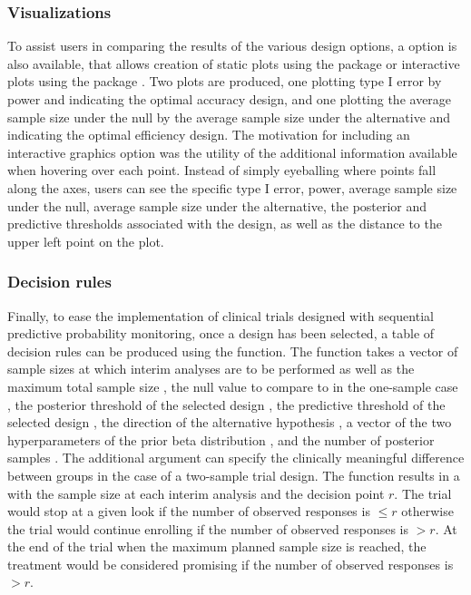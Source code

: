 \hypertarget{visualizations}{%
\subsubsection{Visualizations}\label{visualizations}}

To assist users in comparing the results of the various design options,
a  option is also available, that allows creation of static
plots using the  package \citep{Wickham2016} or
interactive plots using the  package
\citep{Sievert2020}. Two plots are produced, one plotting type I error
by power and indicating the optimal accuracy design, and one plotting
the average sample size under the null by the average sample size under
the alternative and indicating the optimal efficiency design. The
motivation for including an interactive graphics option was the utility
of the additional information available when hovering over each point.
Instead of simply eyeballing where points fall along the axes, users can
see the specific type I error, power, average sample size under the
null, average sample size under the alternative, the posterior and
predictive thresholds associated with the design, as well as the
distance to the upper left point on the plot.

\hypertarget{decision-rules}{%
\subsubsection{Decision rules}\label{decision-rules}}

Finally, to ease the implementation of clinical trials designed with
sequential predictive probability monitoring, once a design has been
selected, a table of decision rules can be produced using the
 function. The function takes a vector of
sample sizes at which interim analyses are to be performed  as
well as the maximum total sample size , the null value to
compare to in the one-sample case , the posterior threshold of
the selected design , the predictive threshold of the
selected design , the direction of the alternative hypothesis
, a vector of the two hyperparameters of the prior beta
distribution , and the number of posterior samples .
The additional argument  can specify the clinically
meaningful difference between groups in the case of a two-sample trial
design. The function results in a  with the sample size at
each interim analysis and the decision point \(r\). The trial would stop
at a given look if the number of observed responses is \(\leq r\)
otherwise the trial would continue enrolling if the number of observed
responses is \(>r\). At the end of the trial when the maximum planned
sample size is reached, the treatment would be considered promising if
the number of observed responses is \(>r\).

